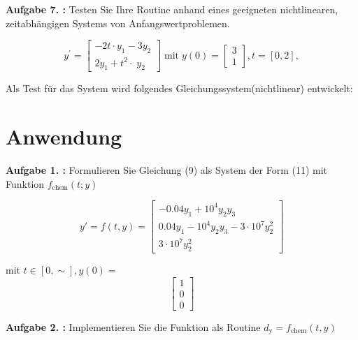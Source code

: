 \clearpage


\begin{figure}[htb]
	
\end{figure}
\begin{figure}[htb]
	
\end{figure}
\clearpage
\begin{mybox}
	\textbf{Aufgabe 7. :} Testen Sie Ihre Routine anhand eines geeigneten nichtlinearen, zeitabhängigen Systems von Anfangswertproblemen.
\end{mybox}

\begin{equation}
y^{\prime } =\left\lbrack \begin{array}{c}
	-2t\cdot y_1 -3y_2 \\
	2y_1 +{t^2 \cdot \;y}_2 
\end{array}\right\rbrack \;\mathrm{mit}\;y\left(0\right)=\left\lbrack \begin{array}{c}
	3\\
	1
\end{array}\right\rbrack ,t=\left\lbrack 0,2\right\rbrack ,
\end{equation}

Als Test für das System wird folgendes Gleichungssystem(nichtlinear) entwickelt:



\section{Anwendung}
\begin{mybox}
	\textbf{Aufgabe 1. :} Formulieren Sie Gleichung (9) als System der Form (11) mit Funktion $f_{\mathrm{chem}}(t; y)$
\end{mybox}



\begin{equation}
	y' = f(t,y) = 
\begin{bmatrix}
	-0.04y_1 + 10^4y_2y_3 \\
	0.04y_1-10^4y_2y_3-3\cdot 10^7y^2_2 \\
	3 \cdot 10^7y^2_2 
\end{bmatrix}  
\end{equation}


mit $ t\in [0,\sim], y(0) = $ 
\begin{equation}
\begin{bmatrix}
	1 \\
	0 \\
	0
\end{bmatrix}
\end{equation}
\begin{mybox}
	\textbf{Aufgabe 2. :}  Implementieren Sie die Funktion als Routine $ d_\mathrm{y} = f_{\mathrm{chem}}(t,y) $
\end{mybox}



